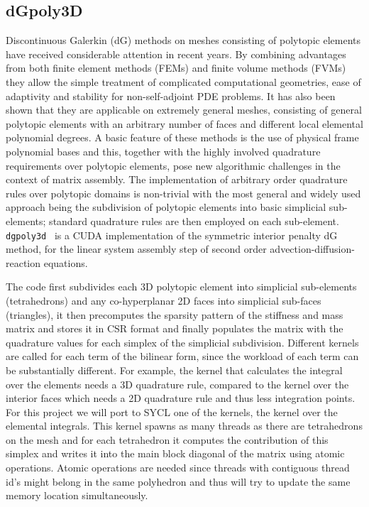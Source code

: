 \documentclass[../main]{subfiles}
\begin{document}
\subsection{dGpoly3D}\label{sec:dgpoly3d}

Discontinuous Galerkin (dG) methods on meshes consisting of polytopic elements have received considerable attention in recent years.
By combining advantages from both finite element methods (FEMs) and finite volume methods (FVMs) they allow the simple treatment of complicated computational geometries, ease of adaptivity and stability for non-self-adjoint PDE problems.
It has also been shown that they are applicable on extremely general meshes, consisting of general polytopic elements with an arbitrary number of faces and different local elemental polynomial degrees.
A basic feature of these methods is the use of physical frame polynomial bases and this, together with the highly involved quadrature requirements over polytopic elements, pose new algorithmic challenges in the context of matrix assembly.
The implementation of arbitrary order quadrature rules over polytopic domains is non-trivial with the most general and widely used approach being the subdivision of polytopic elements into basic simplicial sub-elements; standard quadrature rules are then employed on each sub-element.
\texttt{dgpoly3d}~\cite{dong_gpu-accelerated_2021} is a CUDA implementation of the symmetric interior penalty dG method, for the linear system assembly step of second order advection-diffusion-reaction equations.

The code first subdivides each 3D polytopic element into simplicial sub-elements (tetrahedrons) and any co-hyperplanar 2D faces into simplicial sub-faces (triangles), it then precomputes the sparsity pattern of the stiffness and mass matrix and stores it in CSR format and finally populates the matrix with the quadrature values for each simplex of the simplicial subdivision.
Different kernels are called for each term of the bilinear form, since the workload of each term can be substantially different.
For example, the kernel that calculates the integral over the elements needs a 3D quadrature rule, compared to the kernel over the interior faces which needs a 2D quadrature rule and thus less integration points.
For this project we will port to SYCL one of the kernels, the kernel over the elemental integrals.
This kernel spawns as many threads as there are tetrahedrons on the mesh and for each tetrahedron it computes the contribution of this simplex and writes it into the main block diagonal of the matrix using atomic operations.
Atomic operations are needed since threads with contiguous thread id's might belong in the same polyhedron and thus will try to update the same memory location simultaneously.
\end{document}

